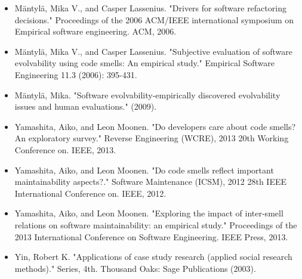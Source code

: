 \documentclass[english,12pt,a4paper,pdftex,sci,utf8]{aaltothesis}
\begin{document}
\begin{thebibliography}{99}
\begin{itemize}
\item Mäntylä, Mika V., and Casper Lassenius. "Drivers for software refactoring decisions." Proceedings of the 2006 ACM/IEEE international symposium on Empirical software engineering. ACM, 2006.

\item Mäntylä, Mika V., and Casper Lassenius. "Subjective evaluation of software evolvability using code smells: An empirical study." Empirical Software Engineering 11.3 (2006): 395-431.

\item Mäntylä, Mika. "Software evolvability-empirically discovered evolvability issues and human evaluations." (2009).

\item Yamashita, Aiko, and Leon Moonen. "Do developers care about code smells? An exploratory survey." Reverse Engineering (WCRE), 2013 20th Working Conference on. IEEE, 2013.

\item Yamashita, Aiko, and Leon Moonen. "Do code smells reflect important maintainability aspects?." Software Maintenance (ICSM), 2012 28th IEEE International Conference on. IEEE, 2012.

\item Yamashita, Aiko, and Leon Moonen. "Exploring the impact of inter-smell relations on software maintainability: an empirical study." Proceedings of the 2013 International Conference on Software Engineering. IEEE Press, 2013.

\item Yin, Robert K. "Applications of case study research (applied social research methods)." Series, 4th. Thousand Oaks: Sage Publications (2003).
\end{itemize}



  


\end{thebibliography}
\end{document}
